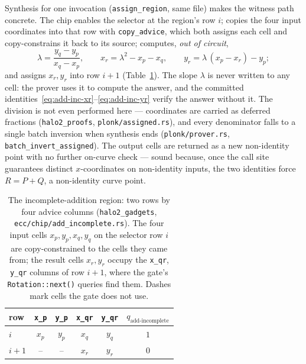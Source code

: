 \documentclass[11pt,a4paper]{article}
\theoremstyle{definition}
\begin{document}
Synthesis for one invocation (\texttt{assign\_region}, same file) makes the
witness path concrete. The chip enables the selector at the region's row
$i$; copies the four input coordinates into that row with
\texttt{copy\_advice}, which both assigns each cell and copy-constrains it
back to its source; computes, \emph{out of circuit},
\[
\lambda = \frac{y_q - y_p}{x_q - x_p}, \qquad
x_r = \lambda^2 - x_p - x_q, \qquad
y_r = \lambda\,(x_p - x_r) - y_p;
\]
and assigns $x_r, y_r$ into row $i+1$ (Table~\ref{tab:add-inc-region}). The
slope $\lambda$ is never written to any cell: the prover uses it to compute
the answer, and the committed
identities~\eqref{eq:add-inc-xr}--\eqref{eq:add-inc-yr} verify the answer
without it. The division is not even performed here --- coordinates are
carried as deferred fractions (\texttt{halo2\_proofs},
\texttt{plonk/assigned.rs}), and every denominator falls to a single batch
inversion when synthesis ends (\texttt{plonk/prover.rs},
\texttt{batch\_invert\_assigned}). The output cells are returned as a new
non-identity point with no further on-curve check --- sound because, once
the call site guarantees distinct $x$-coordinates on non-identity inputs,
the two identities force $R = P + Q$, a non-identity curve point.

\begin{table}[htbp]
\centering
\begin{tabular}{l cccc c}
\toprule
row & \texttt{x\_p} & \texttt{y\_p} & \texttt{x\_qr} & \texttt{y\_qr} &
  $q_{\text{add-incomplete}}$ \\
\midrule
$i$     & $x_p$ & $y_p$ & $x_q$ & $y_q$ & $1$ \\
$i+1$   & --    & --    & $x_r$ & $y_r$ & $0$ \\
\bottomrule
\end{tabular}
\caption{The incomplete-addition region: two rows by four advice columns
(\texttt{halo2\_gadgets}, \texttt{ecc/chip/add\_incomplete.rs}). The four
input cells $x_p, y_p, x_q, y_q$ on the selector row $i$ are
copy-constrained to the cells they came from; the result cells $x_r, y_r$
occupy the \texttt{x\_qr}, \texttt{y\_qr} columns of row $i+1$, where the
gate's \texttt{Rotation::next()} queries find them. Dashes mark cells the
gate does not use.}
\label{tab:add-inc-region}
\end{table}
\end{document}
